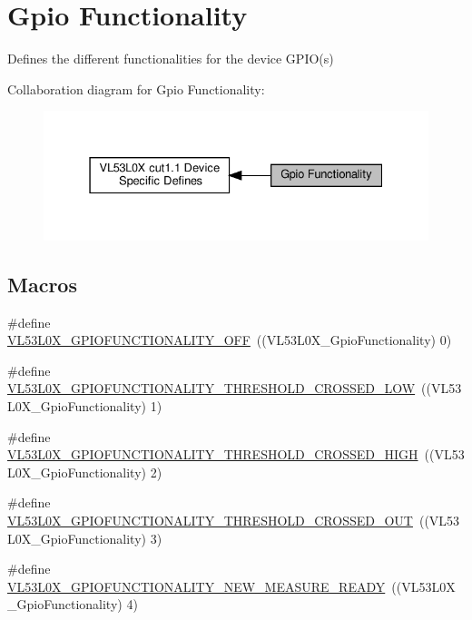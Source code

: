 \hypertarget{group__VL53L0X__GpioFunctionality__group}{}\section{Gpio Functionality}
\label{group__VL53L0X__GpioFunctionality__group}


Defines the different functionalities for the device G\+P\+I\+O(s)  


Collaboration diagram for Gpio Functionality\+:\nopagebreak
\begin{figure}[H]
\begin{center}
\leavevmode
\includegraphics[width=331pt]{group__VL53L0X__GpioFunctionality__group}
\end{center}
\end{figure}
\subsection*{Macros}
\begin{DoxyCompactItemize}
\item 
\#define \hyperlink{group__VL53L0X__GpioFunctionality__group_gafd418cbb738c9910df7ac6a295756bab}{V\+L53\+L0\+X\+\_\+\+G\+P\+I\+O\+F\+U\+N\+C\+T\+I\+O\+N\+A\+L\+I\+T\+Y\+\_\+\+O\+FF}~((V\+L53\+L0\+X\+\_\+\+Gpio\+Functionality)  0)
\item 
\#define \hyperlink{group__VL53L0X__GpioFunctionality__group_ga83eb94bc4301f3b4b23ca38d3d7254a8}{V\+L53\+L0\+X\+\_\+\+G\+P\+I\+O\+F\+U\+N\+C\+T\+I\+O\+N\+A\+L\+I\+T\+Y\+\_\+\+T\+H\+R\+E\+S\+H\+O\+L\+D\+\_\+\+C\+R\+O\+S\+S\+E\+D\+\_\+\+L\+OW}~((V\+L53\+L0\+X\+\_\+\+Gpio\+Functionality)  1)
\item 
\#define \hyperlink{group__VL53L0X__GpioFunctionality__group_gad62d562dde58fb90579a9cdb8730ef4a}{V\+L53\+L0\+X\+\_\+\+G\+P\+I\+O\+F\+U\+N\+C\+T\+I\+O\+N\+A\+L\+I\+T\+Y\+\_\+\+T\+H\+R\+E\+S\+H\+O\+L\+D\+\_\+\+C\+R\+O\+S\+S\+E\+D\+\_\+\+H\+I\+GH}~((V\+L53\+L0\+X\+\_\+\+Gpio\+Functionality)  2)
\item 
\#define \hyperlink{group__VL53L0X__GpioFunctionality__group_gaed6e0c9247a90235c09a7321443c4a54}{V\+L53\+L0\+X\+\_\+\+G\+P\+I\+O\+F\+U\+N\+C\+T\+I\+O\+N\+A\+L\+I\+T\+Y\+\_\+\+T\+H\+R\+E\+S\+H\+O\+L\+D\+\_\+\+C\+R\+O\+S\+S\+E\+D\+\_\+\+O\+UT}~((V\+L53\+L0\+X\+\_\+\+Gpio\+Functionality)  3)
\item 
\#define \hyperlink{group__VL53L0X__GpioFunctionality__group_gaade66f66478f543456a11f854a5bf7de}{V\+L53\+L0\+X\+\_\+\+G\+P\+I\+O\+F\+U\+N\+C\+T\+I\+O\+N\+A\+L\+I\+T\+Y\+\_\+\+N\+E\+W\+\_\+\+M\+E\+A\+S\+U\+R\+E\+\_\+\+R\+E\+A\+DY}~((V\+L53\+L0\+X\+\_\+\+Gpio\+Functionality)  4)
\end{DoxyCompactItemize}

